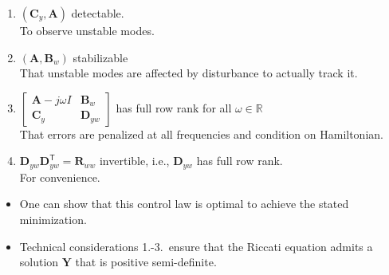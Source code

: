 \begin{enumerate}
    \item $(\mathbf{C}_y,\mathbf{A})$ detectable.\\
          To observe unstable modes.
    \item $(\mathbf{A},\mathbf{B}_w)$ stabilizable\\
          That unstable modes are affected by disturbance to actually track it.
    \item $\begin{bmatrix}\mathbf{A}-j\omega I&\mathbf{B}_w\\\mathbf{C}_y&\mathbf{D}_{yw}\end{bmatrix}$ has full row rank for all $\omega\in\mathbb{R}$\\
          That errors are penalized at all frequencies and condition on Hamiltonian.
    \item $\mathbf{D}_{yw} \mathbf{D}_{yw}^{\mathsf{T}}=\mathbf{R}_{ww}$ invertible, i.e., $\mathbf{D}_{yw}$ has full row rank.\\
          For convenience.
\end{enumerate}


\begin{itemize}
    \item One can show that this control law is optimal to achieve the stated minimization.
    \item Technical considerations 1.-3.\ ensure that the Riccati equation admits a solution $\mathbf{Y}$ that is positive semi-definite.
\end{itemize}

